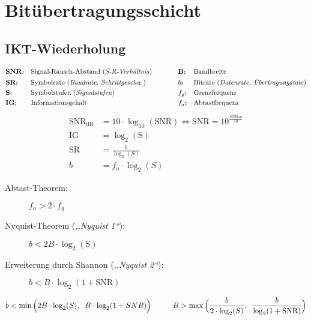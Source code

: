\documentclass[a4paper]{article}
\newcommand{\hs}[1]{\hspace{#1}}
\begin{document}
\section{Bitübertragungsschicht}
\subsection{IKT-Wiederholung}
\begin{align*}
    &\textbf{SNR:} && \text{Signal-Rausch-Abstand (\textit{S-R-Verhältnis})} \hs{1cm} && \textbf{B:} && \text{Bandbreite} \\
    &\textbf{SR:} && \text{Symbolrate (\textit{Baudrate, Schrittgeschw.})} \hs{1cm} && b \textbf{:} && \text{Bitrate (\textit{Datenrate, Übertragungsrate})} \\
    &\textbf{S:} && \text{Symbolstufen (\textit{Signalstufen})} \hs{1cm} && f_g \textbf{:} && \text{Grenzfrequenz} \\
    &\textbf{IG:} && \text{Informationsgehalt} \hs{1cm} && f_a \textbf{:} && \text{Abtastfrequenz}
\end{align*}
%
\begin{align*}
    \text{SNR}_{\text{dB}} &= 10 \cdot \log_{10}(\text{SNR}) \iff \text{SNR} = 10^{\frac{\text{SNR}_{\text{dB}}}{10}}\\
    \text{IG} &= \log_2(\text{S})\\
    \text{SR} &= \frac{b}{\log_2(S)}\\
    b &= f_a \cdot \log_2(S)
\end{align*}
\begin{description}
    \item[Abtast-Theorem:] $f_a > 2 \cdot f_g$
    \item[Nyquist-Theorem (\textit{,,Nyquist 1``}):] $b < 2B \cdot \log_2(\text{S})$
    \item[Erweiterung durch Shannon (\textit{,,Nyquist 2``}):] $b < B \cdot \log_2(1 + \text{SNR})$
\end{description}
%
\[
    b < \min \Big( 2B \cdot \log_2(S), \hs{2mm} B \cdot \log_2(1 + SNR) \Big) \hs{1cm}
    B > \max \Big( \frac{b}{2 \cdot \log_2(S)}, \hs{2mm} \frac{b}{\log_2(1+\text{SNR})} \Big)
\]
\end{document}
